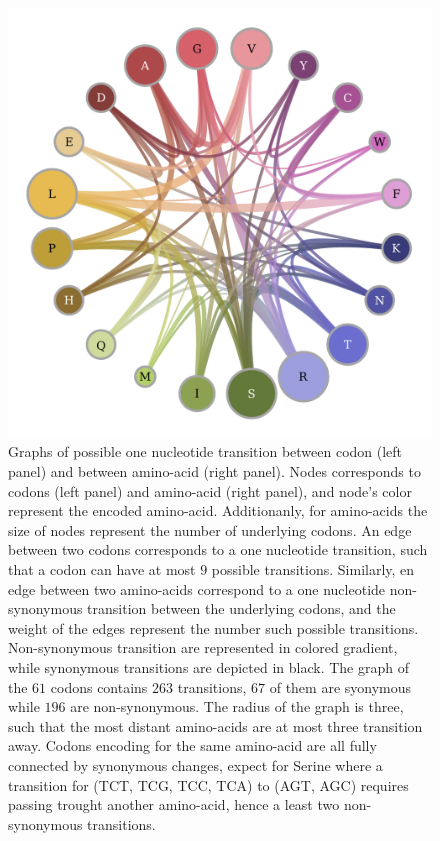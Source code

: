 \begin{figure}[htb!]
\begin{center}
\begin{minipage}{0.49\linewidth}
			\includegraphics[width=\linewidth, page=1]{figures/gt-aa-tab20b.pdf}
		\end{minipage}
	\end{center}
	\caption[Graphs of codon and amino-acid transitions]{
		\label{fig:graph-codons-aa}
		Graphs of possible one nucleotide transition between codon (left panel) and between amino-acid (right panel).
		Nodes corresponds to codons (left panel) and amino-acid (right panel), and node's color represent the encoded amino-acid.
		Additionanly, for amino-acids the size of nodes represent the number of underlying codons.
		An edge between two codons corresponds to a one nucleotide transition, such that a codon can have at most $9$ possible transitions. 
		Similarly, en edge between two amino-acids correspond to a one nucleotide non-synonymous transition between the underlying codons, and the weight of the edges represent the number such possible transitions.
		Non-synonymous transition are represented in colored gradient, while synonymous transitions are depicted in black.
		The graph of the $61$ codons contains $263$ transitions, $67$ of them are syonymous while $196$ are non-synonymous.
		The radius of the graph is three, such that the most distant amino-acids are at most three transition away.
		Codons encoding for the same amino-acid are all fully connected by synonymous changes, expect for Serine where a transition for (TCT, TCG, TCC,	TCA) to (AGT, AGC) requires passing trought another amino-acid, hence a least two non-synonymous transitions.
}
\end{figure}
